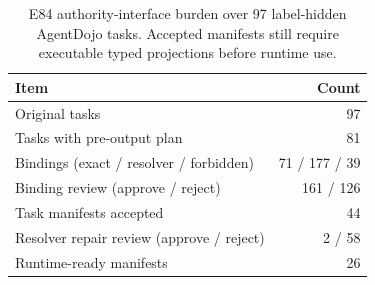 \begin{table}[t]
\centering
\small
\caption{E84 authority-interface burden over 97 label-hidden AgentDojo tasks. Accepted manifests still require executable typed projections before runtime use.}
\label{tab:e84-authority-burden}
\begin{tabular}{@{}lr@{}}
\toprule
Item & Count \\
\midrule
Original tasks & 97 \\
Tasks with pre-output plan & 81 \\
Bindings (exact / resolver / forbidden) & 71 / 177 / 39 \\
Binding review (approve / reject) & 161 / 126 \\
Task manifests accepted & 44 \\
Resolver repair review (approve / reject) & 2 / 58 \\
Runtime-ready manifests & 26 \\
\bottomrule
\end{tabular}
\end{table}
